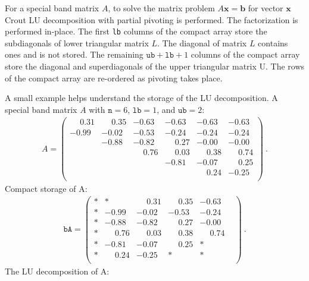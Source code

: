 \documentclass[10pt]{article}
\newcommand{\bfb}{\mathbf{b}}
\newcommand{\bfx}{\mathbf{x}}
\begin{document}
For a special band matrix $A$, to solve the matrix problem $A\bfx =
\bfb$ for vector $\bfx$ Crout LU decomposition with partial pivoting is performed.
The factorization is performed in-place. The first \texttt{lb} columns of the
compact array store the subdiagonals of lower triangular matrix $L$. The
diagonal of matrix $L$ contains ones and is not stored. The remaining
$\texttt{ub}+\texttt{lb}+1$ columns of the compact array store the diagonal and
superdiagonals of the upper triangular matrix U. The rows of the compact array
are re-ordered as pivoting takes place.

A small example helps understand the storage of the LU decomposition.
A special band matrix $A$ with $\texttt{n}=6$, $\texttt{lb}=1$, and $\texttt{ub}=2$:
\begin{align}
A=
  \left(
  \begin{array}{cccccc}
\phantom{+}0.31 & \phantom{+}0.35 & -0.63 & -0.63 & -0.63 & -0.63\\
-0.99 & -0.02 & -0.53 & -0.24 & -0.24 & -0.24\\
      & -0.88 & -0.82 & \phantom{+}0.27 & -0.00 & -0.00\\
      &       & \phantom{+}0.76 & \phantom{+}0.03 & \phantom{+}0.38 & \phantom{+}0.74\\
      &       &       & -0.81 & -0.07 & \phantom{+}0.25\\
      &       &       &       & \phantom{+}0.24 & -0.25\\
  \end{array}
  \right)
  ~.
\end{align}
Compact storage of A:
\begin{align}
  \texttt{bA} = 
  \left(
  \begin{array}{cccccc}
 *  &  *    & \phantom{+}0.31 & \phantom{+}0.35 & -0.63 &\\
 *  & -0.99 & -0.02 & -0.53 & -0.24 &\\
 *  & -0.88 & -0.82 & \phantom{+}0.27 & -0.00 &\\
 *  & \phantom{+}0.76 & \phantom{+}0.03 & \phantom{+}0.38 & \phantom{+}0.74 &\\
 *  & -0.81 & -0.07 & \phantom{+}0.25 &  *  &\\
 *  & \phantom{+}0.24 & -0.25 &    *  &  *  &\\ 
  \end{array}
  \right)
  ~.
\end{align}
The LU decomposition of A:
\end{document}
